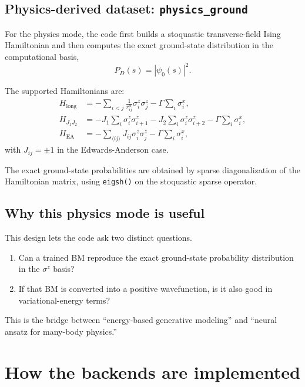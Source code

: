 \documentclass[11pt]{article}
\begin{document}
\subsection{Physics-derived dataset: \texttt{physics\_ground}}

For the physics mode, the code first builds a stoquastic transverse-field Ising
Hamiltonian and then computes the exact ground-state distribution in the
computational basis,
\begin{equation}
P_D(s)=|\psi_0(s)|^2.
\end{equation}

The supported Hamiltonians are:
\begin{align}
H_{\mathrm{long}} &= -\sum_{i<j} \frac{1}{r_{ij}^{\alpha}}\sigma_i^z\sigma_j^z
- \Gamma\sum_i \sigma_i^x,\\
H_{J_1J_2} &= -J_1\sum_i \sigma_i^z\sigma_{i+1}^z
- J_2\sum_i \sigma_i^z\sigma_{i+2}^z
- \Gamma\sum_i \sigma_i^x,\\
H_{\mathrm{EA}} &= -\sum_{\langle ij\rangle} J_{ij}\sigma_i^z\sigma_j^z
- \Gamma\sum_i \sigma_i^x,
\end{align}
with $J_{ij}=\pm 1$ in the Edwards-Anderson case.

The exact ground-state probabilities are obtained by sparse diagonalization of
the Hamiltonian matrix, using \texttt{eigsh()} on the stoquastic sparse operator.

\subsection{Why this physics mode is useful}

This design lets the code ask two distinct questions.

\begin{enumerate}
  \item Can a trained BM reproduce the exact ground-state probability
  distribution in the $\sigma^z$ basis?
  \item If that BM is converted into a positive wavefunction,
  is it also good in variational-energy terms?
\end{enumerate}

This is the bridge between ``energy-based generative modeling'' and ``neural
ansatz for many-body physics.''

\section{How the backends are implemented}
\end{document}
